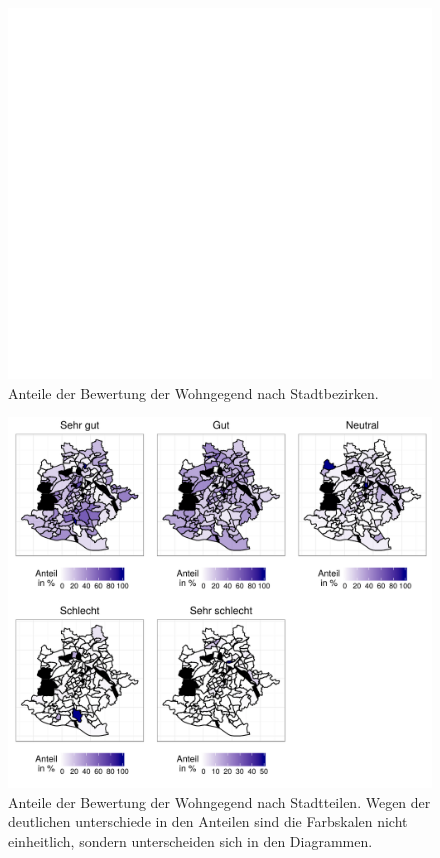 \documentclass{Vorlage}
\begin{document}
\begin{appendix}
\begin{figure}[h]
 \begin{center}
 \includegraphics[scale=0.8]{Pictures/BWohn}
 \caption{Anteile der Bewertung der Wohngegend nach Stadtbezirken.}
 \label{BWohn}
 \end{center}
\end{figure}

\begin{figure}[h]
 \begin{center}
 \includegraphics[scale=0.8]{Pictures/SWohn}
 \caption{Anteile der Bewertung der Wohngegend nach Stadtteilen. Wegen der deutlichen unterschiede in den Anteilen sind die Farbskalen nicht einheitlich, sondern unterscheiden sich in den Diagrammen.}
 \label{SWohn}
 \end{center}
\end{figure}


\end{appendix}
\end{document}
